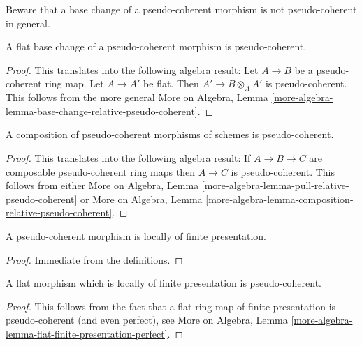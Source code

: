 \noindent
Beware that a base change of a pseudo-coherent morphism is not
pseudo-coherent in general.

\begin{lemma}
\label{lemma-flat-base-change-pseudo-coherent}
A flat base change of a pseudo-coherent morphism is pseudo-coherent.
\end{lemma}

\begin{proof}
This translates into the following algebra result:
Let $A \to B$ be a pseudo-coherent ring map.
Let $A \to A'$ be flat. Then $A' \to B \otimes_A A'$ is
pseudo-coherent. This follows from the more general
More on Algebra,
Lemma \ref{more-algebra-lemma-base-change-relative-pseudo-coherent}.
\end{proof}

\begin{lemma}
\label{lemma-composition-pseudo-coherent}
A composition of pseudo-coherent morphisms of schemes is
pseudo-coherent.
\end{lemma}

\begin{proof}
This translates into the following algebra result:
If $A \to B \to C$ are composable pseudo-coherent ring maps
then $A \to C$ is pseudo-coherent. This follows from either
More on Algebra,
Lemma \ref{more-algebra-lemma-pull-relative-pseudo-coherent}
or
More on Algebra,
Lemma \ref{more-algebra-lemma-composition-relative-pseudo-coherent}.
\end{proof}

\begin{lemma}
\label{lemma-pseudo-coherent-finite-presentation}
A pseudo-coherent morphism is locally of finite presentation.
\end{lemma}

\begin{proof}
Immediate from the definitions.
\end{proof}

\begin{lemma}
\label{lemma-flat-finite-presentation-pseudo-coherent}
A flat morphism which is locally of finite presentation is pseudo-coherent.
\end{lemma}

\begin{proof}
This follows from the fact that a flat ring map of finite presentation is
pseudo-coherent (and even perfect), see
More on Algebra,
Lemma \ref{more-algebra-lemma-flat-finite-presentation-perfect}.
\end{proof}

